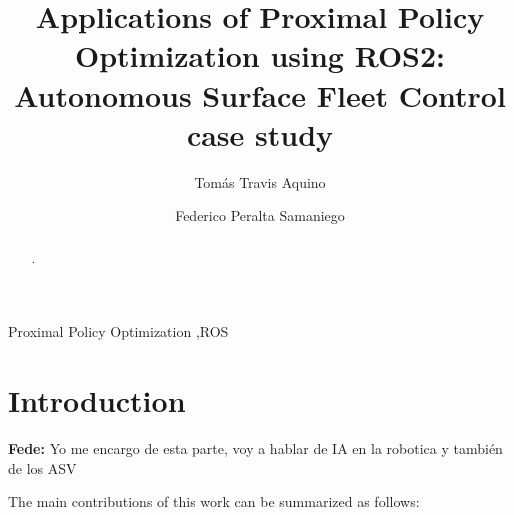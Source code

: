 \documentclass[preprint,3p]{elsarticle}
\newcommand{\fcom}[1]{{ \color{orange}\textbf{Fede:} #1}}
\begin{document}
\begin{frontmatter}

\title{Applications of Proximal Policy Optimization using ROS2: Autonomous Surface Fleet Control case study}


\author[inst1]{Tomás Travis Aquino}
            
\author[inst2]{Federico Peralta Samaniego}

            
\begin{abstract}
.
\end{abstract}



\begin{keyword}
Proximal Policy Optimization \sep ROS
\end{keyword}

\end{frontmatter}

\section{Introduction}

\fcom{Yo me encargo de esta parte, voy a hablar de IA en la robotica y también de los ASV}



The main contributions of this work can be summarized as follows:
\end{document}

